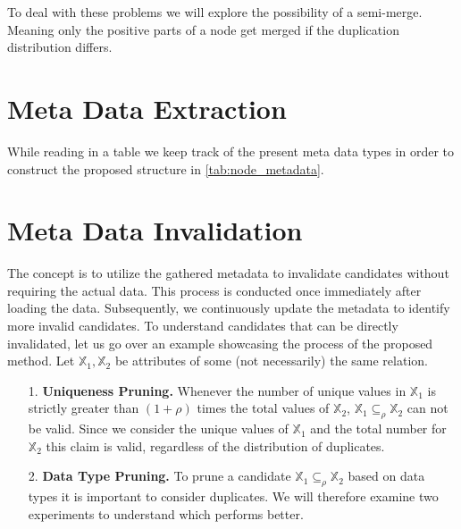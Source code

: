  To deal with these problems we will explore the possibility of a semi-merge. Meaning only the positive parts of a node get merged if the duplication distribution differs.

\section{Meta Data Extraction}\label{sec:meta-data-ext}
While reading in a table we keep track of the present meta data types in order to construct the proposed structure in \ref{tab:node_metadata}.

\section{Meta Data Invalidation}
The concept is to utilize the gathered metadata to invalidate candidates without requiring the actual data. This process is conducted once immediately after loading the data. Subsequently, we continuously update the metadata to identify more invalid candidates. To understand candidates that can be directly invalidated, let us go over an example showcasing the process of the proposed method. Let $\mathbb{X}_1, \mathbb{X}_2$ be attributes of some (not necessarily) the same relation.
\begin{itemize}
    \item[1.] \textbf{Uniqueness Pruning.} Whenever the number of unique values in $\mathbb{X}_1$ is strictly greater than $(1 + \rho)$ times the total values of $\mathbb{X}_2$, $\mathbb{X}_1 \subseteq_\rho \mathbb{X}_2$ can not be valid. Since we consider the unique values of $\mathbb{X}_1$ and the total number for $\mathbb{X}_2$ this claim is valid, regardless of the distribution of duplicates.
    \item[2.] \textbf{Data Type Pruning.} To prune a candidate $\mathbb{X}_1 \subseteq_\rho \mathbb{X}_2$ based on data types it is important to consider duplicates. We will therefore examine two experiments to understand which performs better.
\end{itemize}